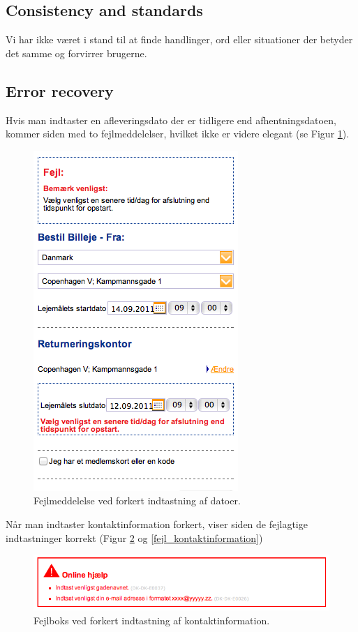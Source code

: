 \documentclass[a4paper]{article}
\begin{document}
\subsection{Consistency and standards}
Vi har ikke været i stand til at finde handlinger, ord eller situationer der
betyder det samme og forvirrer brugerne.

\subsection{Error recovery}
Hvis man indtaster en afleveringsdato der er tidligere end afhentningsdatoen,
kommer siden med to fejlmeddelelser, hvilket ikke er videre elegant (se Figur
\ref{fejl_datoer}).

\begin{figure}[htbp]
  \begin{center}
    \includegraphics[scale=.6]{6.png}
  \end{center}
  \caption{Fejlmeddelelse ved forkert indtastning af datoer.}
  \label{fejl_datoer}
\end{figure}

Når man indtaster kontaktinformation forkert, viser siden de fejlagtige
indtastninger korrekt (Figur \ref{fejl_boks} og \ref{fejl_kontaktinformation})

\begin{figure}[htbp]
  \begin{center}
    \includegraphics[scale=.6]{10.png}
  \end{center}
  \caption{Fejlboks ved forkert indtastning af kontaktinformation.}
  \label{fejl_boks}
\end{figure}
\end{document}
